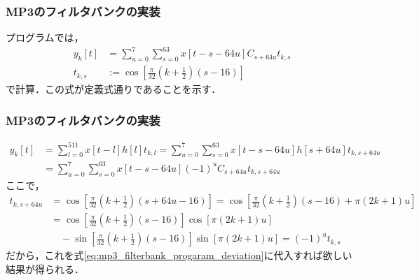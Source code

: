 \documentclass[14pt,xcolor=dvipsnames,table,dvipdfmx]{beamer}
\begin{document}
\begin{frame}[c]
    \frametitle{MP3のフィルタバンクの実装}
    プログラムでは，
    \begin{align*}
        y_{k}[t] &= \sum_{u = 0}^{7} \sum_{s = 0}^{63} x[t - s - 64u] C_{s + 64u} t_{k,s} \\
        t_{k,s} &:= \cos\left[ \frac{\pi}{32}\left( k + \frac{1}{2} \right) \left( s - 16 \right) \right]
    \end{align*}
    で計算．この式が定義式通りであることを示す．
\end{frame}

\begin{frame}[c]
    \frametitle{MP3のフィルタバンクの実装}
    \scriptsize
    \begin{align}
        y_{k}[t] &= \sum_{l = 0}^{511} x[t - l] h[l] t_{k,l} = \sum_{u = 0}^{7} \sum_{s = 0}^{63} x[t - s - 64u] h[s + 64u] t_{k,s+64u} \nonumber \\
        &= \sum_{u = 0}^{7} \sum_{s = 0}^{63} x[t - s - 64u] (-1)^{u} C_{s + 64u} t_{k,s+64u} \label{eq:mp3_filterbank_progaram_deviation}
    \end{align}
    ここで，
    \begin{align*}
        t_{k,s+64u} &= \cos\left[ \frac{\pi}{32} \left( k + \frac{1}{2} \right) (s + 64u - 16) \right] = \cos\left[ \frac{\pi}{32} \left( k + \frac{1}{2} \right) (s - 16) + \pi \left( 2k + 1 \right) u \right] \\
        &= \cos\left[ \frac{\pi}{32} \left( k + \frac{1}{2} \right) (s - 16) \right]\cos\left[ \pi(2k + 1)u \right] \\
        &\quad - \sin\left[ \frac{\pi}{32} \left( k + \frac{1}{2} \right) (s - 16) \right]\sin\left[ \pi(2k + 1)u \right]
        = (-1)^{u} t_{k,s}
    \end{align*}
    だから，これを式\eqref{eq:mp3_filterbank_progaram_deviation}に代入すれば欲しい結果が得られる．
\end{frame}
\end{document}
